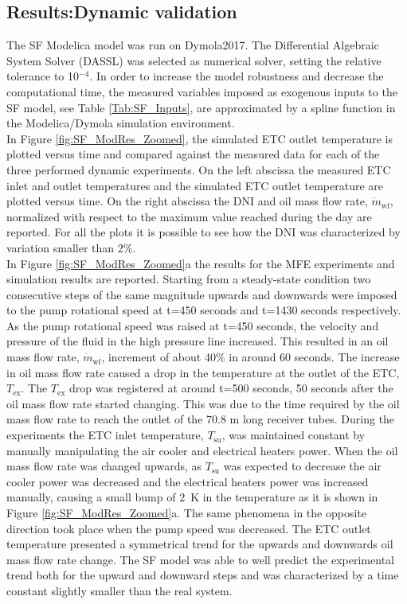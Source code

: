 \documentclass[final,3p,times,review]{elsarticle}
\begin{document}
\subsection{Results:Dynamic validation}  \label{Sec:DynamicValidation}
%
The SF Modelica model was run on Dymola2017. The Differential Algebraic System Solver (DASSL) \cite{Petzold1983} was selected as numerical solver, setting the relative tolerance to 10$^{-4}$. In order to increase the model robustness and decrease the computational time, the measured variables imposed as exogenous inputs to the SF model, see Table \ref{Tab:SF_Inputs}, are approximated by a spline function in the Modelica/Dymola simulation environment.\\
In Figure \ref{fig:SF_ModRes_Zoomed}, the simulated ETC outlet temperature is plotted versus time and compared against the measured data for each of the three performed dynamic experiments. On the left abscissa the measured ETC inlet and outlet temperatures and the simulated ETC outlet temperature are plotted versus time. On the right abscissa the DNI and oil mass flow rate, $\dot{m}_\mathrm{wf}$, normalized with respect to the maximum value reached during the day are reported. For all the plots it is possible to see how the DNI was characterized by variation smaller than 2\%.\\

In Figure \ref{fig:SF_ModRes_Zoomed}a the results for the MFE experiments and simulation results are reported. Starting from a steady-state condition two consecutive steps of the same magnitude upwards and downwards were imposed to the pump rotational speed at t=450 seconds and t=1430 seconds respectively. As the pump rotational speed was raised at t=450 seconds, the velocity and pressure of the fluid in the high pressure line increased. This resulted in an oil mass flow rate, $\dot{m}_\mathrm{wf}$, increment of about 40\% in around 60 seconds. The increase in oil mass flow rate caused a drop in the temperature at the outlet of the ETC, $T_\mathrm{ex}$. The $T_\mathrm{ex}$ drop was registered at around t=500 seconds, 50 seconds after the oil mass flow rate started changing. This was due to the time required by the oil mass flow rate to reach the outlet of the 70.8 m long receiver tubes. During the experiments the ETC inlet temperature, $T_\mathrm{su}$, was maintained constant  by manually manipulating the air cooler and electrical heaters power. 
When the oil mass flow rate was changed upwards, as $T_\mathrm{su}$ was expected to decrease the air cooler power was 
decreased and the electrical heaters power was increased manually, causing a small bump of 2~K in the temperature as it is shown in Figure \ref{fig:SF_ModRes_Zoomed}a.  
The same phenomena in the opposite direction took place when the pump speed was decreased. 
The ETC outlet temperature presented a symmetrical trend for the upwards and downwards oil mass flow rate change. The SF model was able to well predict the experimental trend both for the upward and downward steps and was characterized by a time constant slightly smaller than the real system.\\
\end{document}
